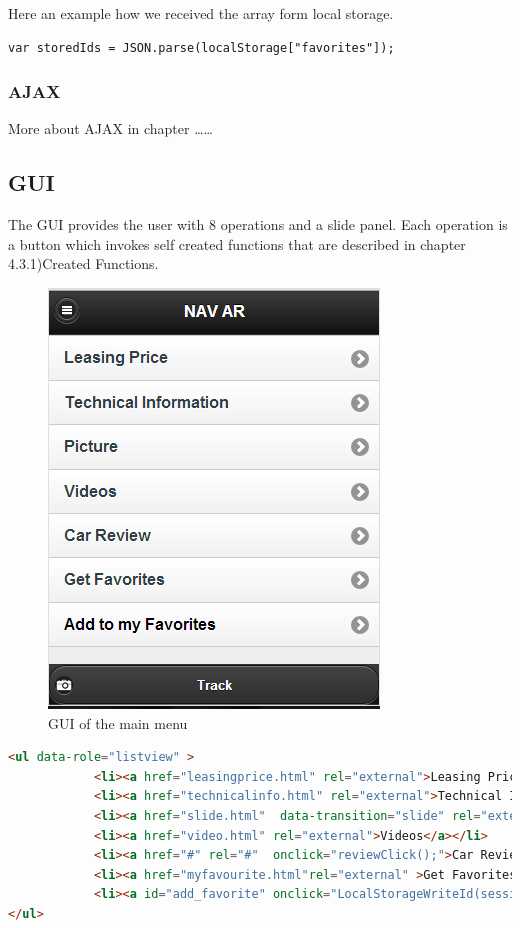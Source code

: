 Here an example how we received the array form local storage.
\\
\begin{lstlisting}[language=html, caption= 
start timer function,captionpos=b]
var storedIds = JSON.parse(localStorage["favorites"]);
\end{lstlisting}

\subsubsection{AJAX}
More about AJAX in chapter ……
\\
\newpage

\subsection{GUI}
The GUI provides the user with 8 operations and a slide panel. Each operation is a button which invokes self created functions that are described in chapter 4.3.1)Created Functions.
\\

\begin{figure}[h]
\centering
\includegraphics[width=0.5\linewidth]{graphics/chapter4/4}
\caption{GUI of the main menu}
\label{fig:5}
\end{figure}


\begin{lstlisting}[language=html, caption= 
GUI source code,captionpos=b]
<ul data-role="listview" >	
            <li><a href="leasingprice.html" rel="external">Leasing Price</a></li>
            <li><a href="technicalinfo.html" rel="external">Technical Information</a></li>
            <li><a href="slide.html"  data-transition="slide" rel="external">Picture</a></li>
            <li><a href="video.html" rel="external">Videos</a></li>
            <li><a href="#" rel="#"  onclick="reviewClick();">Car Review</a></li>
            <li><a href="myfavourite.html"rel="external" >Get Favorites</a></li>
			<li><a id="add_favorite" onclick="LocalStorageWriteId(sessionStorage.getItem('id'),globalcarname);" style="color:red" rel="external" >Add to my Favorites</a></li>
</ul>
\end{lstlisting}



